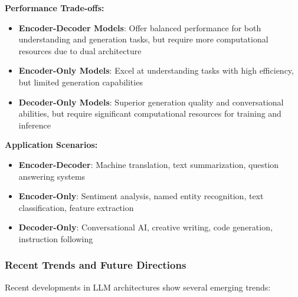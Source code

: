 \documentclass[12pt,a4paper]{article}
\begin{document}
\textbf{Performance Trade-offs:}

\begin{itemize}
    \item \textbf{Encoder-Decoder Models}: Offer balanced performance for both understanding and generation tasks, but require more computational resources due to dual architecture
    \item \textbf{Encoder-Only Models}: Excel at understanding tasks with high efficiency, but limited generation capabilities
    \item \textbf{Decoder-Only Models}: Superior generation quality and conversational abilities, but require significant computational resources for training and inference
\end{itemize}

\textbf{Application Scenarios:}

\begin{itemize}
    \item \textbf{Encoder-Decoder}: Machine translation, text summarization, question answering systems
    \item \textbf{Encoder-Only}: Sentiment analysis, named entity recognition, text classification, feature extraction
    \item \textbf{Decoder-Only}: Conversational AI, creative writing, code generation, instruction following
\end{itemize}

\subsubsection{Recent Trends and Future Directions}

Recent developments in LLM architectures show several emerging trends:
\end{document}
